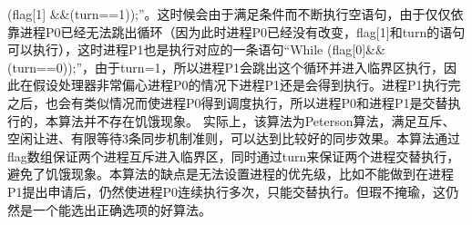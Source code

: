 \begin{solution}
(flag{[}1{]}
\&\&(turn==1));''。这时候会由于满足条件而不断执行空语句，由于仅仅依靠进程P0已经无法跳出循环（因为此时进程P0已经没有改变，flag{[}1{]}和turn的语句可以执行），这时进程P1也是执行对应的一条语句``While
(flag{[}0{]}\&\&(turn==0));''，由于turn=1，所以进程P1会跳出这个循环并进入临界区执行，因此在假设处理器非常偏心进程P0的情况下进程P1还是会得到执行。进程P1执行完之后，也会有类似情况而使进程P0得到调度执行，所以进程P0和进程P1是交替执行的，本算法并不存在饥饿现象。
实际上，该算法为Peterson算法，满足互斥、空闲让进、有限等待3条同步机制准则，可以达到比较好的同步效果。本算法通过flag数组保证两个进程互斥进入临界区，同时通过turn来保证两个进程交替执行，避免了饥饿现象。本算法的缺点是无法设置进程的优先级，比如不能做到在进程P1提出申请后，仍然使进程P0连续执行多次，只能交替执行。但瑕不掩瑜，这仍然是一个能选出正确选项的好算法。
\end{solution}
